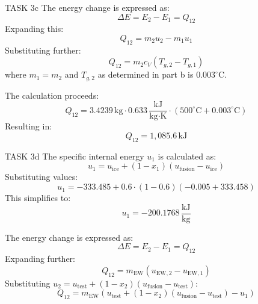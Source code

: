 TASK 3c  
The energy change is expressed as:  
\[
\Delta E = E_2 - E_1 = Q_{12}
\]  
Expanding this:  
\[
Q_{12} = m_2 u_2 - m_1 u_1
\]  
Substituting further:  
\[
Q_{12} = m_2 c_V (T_{g,2} - T_{g,1})
\]  
where \( m_1 = m_2 \) and \( T_{g,2} \) as determined in part b is \( 0.003^\circ\text{C} \).  

The calculation proceeds:  
\[
Q_{12} = 3.4239 \, \text{kg} \cdot 0.633 \, \frac{\text{kJ}}{\text{kg·K}} \cdot (500^\circ\text{C} + 0.003^\circ\text{C})
\]  
Resulting in:  
\[
Q_{12} = 1,085.6 \, \text{kJ}
\]  

TASK 3d  
The specific internal energy \( u_1 \) is calculated as:  
\[
u_1 = u_{\text{ice}} + (1 - x_1)(u_{\text{fusion}} - u_{\text{ice}})
\]  
Substituting values:  
\[
u_1 = -333.485 + 0.6 \cdot (1 - 0.6)(-0.005 + 333.458)
\]  
This simplifies to:  
\[
u_1 = -200.1768 \, \frac{\text{kJ}}{\text{kg}}
\]  

The energy change is expressed as:  
\[
\Delta E = E_2 - E_1 = Q_{12}
\]  
Expanding further:  
\[
Q_{12} = m_{\text{EW}} (u_{\text{EW},2} - u_{\text{EW},1})
\]  
Substituting \( u_2 = u_{\text{test}} + (1 - x_2)(u_{\text{fusion}} - u_{\text{test}}) \):  
\[
Q_{12} = m_{\text{EW}} \left( u_{\text{test}} + (1 - x_2)(u_{\text{fusion}} - u_{\text{test}}) - u_1 \right)
\]  